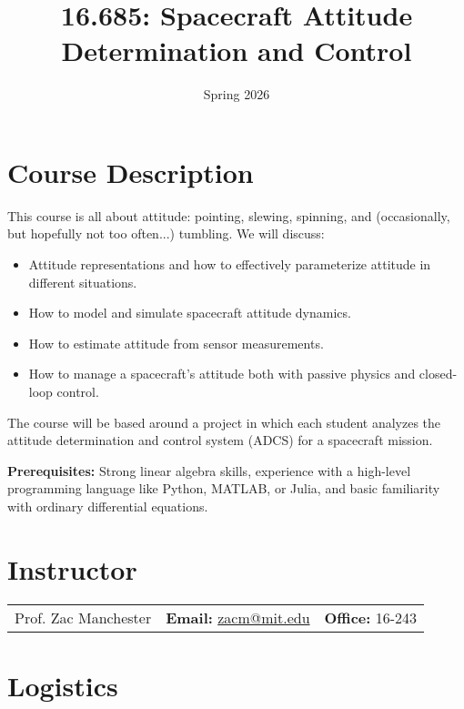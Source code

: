 \documentclass[11pt,letterpaper]{article}
\title{16.685: Spacecraft Attitude Determination and Control}
\author{Spring 2026}
\date{}
\begin{document}
\maketitle


\section*{Course Description}

This course is all about attitude: pointing, slewing, spinning, and (occasionally, but hopefully not too often...) tumbling. We will discuss:
\begin{itemize}
\item Attitude representations and how to effectively parameterize attitude in different situations.
\item How to model and simulate spacecraft attitude dynamics.
\item How to estimate attitude from sensor measurements.
\item How to manage a spacecraft's attitude both with passive physics and closed-loop control.
\end{itemize}
The course will be based around a project in which each student analyzes the attitude determination and control system (ADCS) for a spacecraft mission.

\medskip
\noindent
\textbf{Prerequisites:} Strong linear algebra skills, experience with a high-level programming language like Python, MATLAB, or Julia, and basic familiarity with ordinary differential equations.

\section*{Instructor}

\begin{tabular}{l l l}
	Prof. Zac Manchester & \textbf{Email:} \href{mailto:zacm@mit.edu}{zacm@mit.edu} & \textbf{Office:} 16-243
\end{tabular}

\section*{Logistics}
\end{document}
